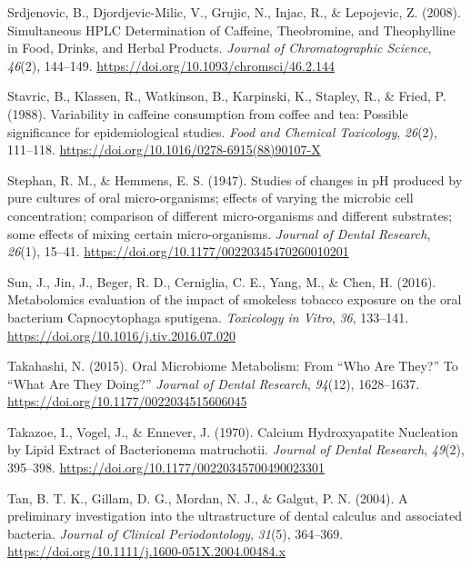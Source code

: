 \documentclass[
  letterpaper,
]{book}
\newlength{\cslhangindent}
\newlength{\cslentryspacingunit} %
\newenvironment{CSLReferences}[2] %
 {%
  \setlength{\parindent}{0pt}
  \ifodd #1
  \let\oldpar\par
  \def\par{\hangindent=\cslhangindent\oldpar}
  \fi
  \setlength{\parskip}{#2\cslentryspacingunit}
 }%
 {}
\begin{document}
\begin{CSLReferences}{1}{0}
\leavevmode{}%
Srdjenovic, B., Djordjevic-Milic, V., Grujic, N., Injac, R., \&
Lepojevic, Z. (2008). Simultaneous {HPLC Determination} of {Caffeine},
{Theobromine}, and {Theophylline} in {Food}, {Drinks}, and {Herbal
Products}. \emph{Journal of Chromatographic Science}, \emph{46}(2),
144--149. \url{https://doi.org/10.1093/chromsci/46.2.144}

\leavevmode{}%
Stavric, B., Klassen, R., Watkinson, B., Karpinski, K., Stapley, R., \&
Fried, P. (1988). Variability in caffeine consumption from coffee and
tea: {Possible} significance for epidemiological studies. \emph{Food and
Chemical Toxicology}, \emph{26}(2), 111--118.
\url{https://doi.org/10.1016/0278-6915(88)90107-X}

\leavevmode{}%
Stephan, R. M., \& Hemmens, E. S. (1947). Studies of changes in {pH}
produced by pure cultures of oral micro-organisms; effects of varying
the microbic cell concentration; comparison of different micro-organisms
and different substrates; some effects of mixing certain
micro-organisms. \emph{Journal of Dental Research}, \emph{26}(1),
15--41. \url{https://doi.org/10.1177/00220345470260010201}

\leavevmode{}%
Sun, J., Jin, J., Beger, R. D., Cerniglia, C. E., Yang, M., \& Chen, H.
(2016). Metabolomics evaluation of the impact of smokeless tobacco
exposure on the oral bacterium {Capnocytophaga} sputigena.
\emph{Toxicology in Vitro}, \emph{36}, 133--141.
\url{https://doi.org/10.1016/j.tiv.2016.07.020}

\leavevmode{}%
Takahashi, N. (2015). Oral {Microbiome Metabolism}: {From} {``{Who Are
They}?''} To {``{What Are They Doing}?''} \emph{Journal of Dental
Research}, \emph{94}(12), 1628--1637.
\url{https://doi.org/10.1177/0022034515606045}

\leavevmode{}%
Takazoe, I., Vogel, J., \& Ennever, J. (1970). Calcium {Hydroxyapatite
Nucleation} by {Lipid Extract} of {Bacterionema} matruchotii.
\emph{Journal of Dental Research}, \emph{49}(2), 395--398.
\url{https://doi.org/10.1177/00220345700490023301}

\leavevmode{}%
Tan, B. T. K., Gillam, D. G., Mordan, N. J., \& Galgut, P. N. (2004). A
preliminary investigation into the ultrastructure of dental calculus and
associated bacteria. \emph{Journal of Clinical Periodontology},
\emph{31}(5), 364--369.
\url{https://doi.org/10.1111/j.1600-051X.2004.00484.x}


\end{CSLReferences}
\end{document}
